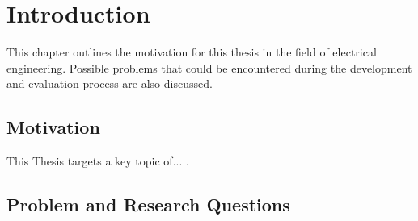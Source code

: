 \chapter{Introduction}
\label{Chapter::Introduction}
This chapter outlines the motivation for this thesis in the field of electrical engineering. Possible problems that could be encountered during the development and evaluation process are also discussed.

\section{Motivation}
\label{Section::Motivation}
This Thesis targets a key topic of... \cite{ayersPEMElectrolysisForerunner2021}.

\section{Problem and Research Questions}
\label{Section::Problem_and_Research_Questions}